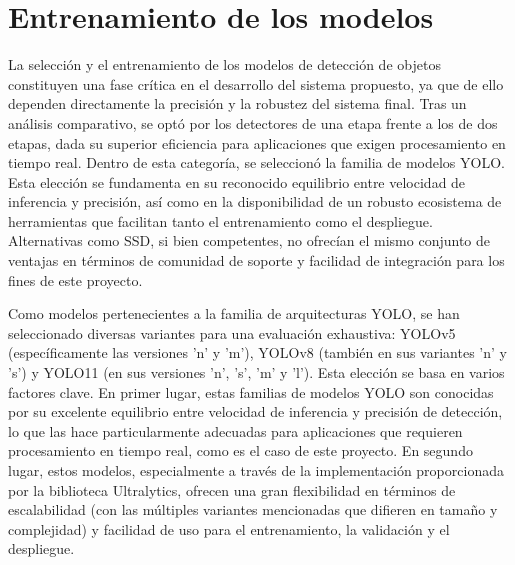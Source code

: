 \documentclass[11pt,spanish,listoffigures,listoftables]{tfgetsinf}
\begin{document}
\section{Entrenamiento de los modelos} \label{sec:entrenamiento_modelo}

La selección y el entrenamiento de los modelos de detección de objetos constituyen una fase crítica en el desarrollo del sistema propuesto, ya que de ello dependen directamente la precisión y la robustez del sistema final.
Tras un análisis comparativo, se optó por los detectores de una etapa frente a los de dos etapas, dada su superior eficiencia para aplicaciones que exigen procesamiento en tiempo real. Dentro de esta categoría, se seleccionó la familia de modelos YOLO. Esta elección se fundamenta en su reconocido equilibrio entre velocidad de inferencia y precisión, así como en la disponibilidad de un robusto ecosistema de herramientas que facilitan tanto el entrenamiento como el despliegue. Alternativas como SSD, si bien competentes, no ofrecían el mismo conjunto de ventajas en términos de comunidad de soporte y facilidad de integración para los fines de este proyecto.

Como modelos pertenecientes a la familia de arquitecturas YOLO, se han seleccionado diversas variantes para una evaluación exhaustiva: YOLOv5 (específicamente las versiones 'n' y 'm'), YOLOv8 (también en sus variantes 'n' y 's') y YOLO11 (en sus versiones 'n', 's', 'm' y 'l'). Esta elección se basa en varios factores clave. En primer lugar, estas familias de modelos YOLO son conocidas por su excelente equilibrio entre velocidad de inferencia y precisión de detección, lo que las hace particularmente adecuadas para aplicaciones que requieren procesamiento en tiempo real, como es el caso de este proyecto. En segundo lugar, estos modelos, especialmente a través de la implementación proporcionada por la biblioteca Ultralytics, ofrecen una gran flexibilidad en términos de escalabilidad (con las múltiples variantes mencionadas que difieren en tamaño y complejidad) y facilidad de uso para el entrenamiento, la validación y el despliegue.
\end{document}
